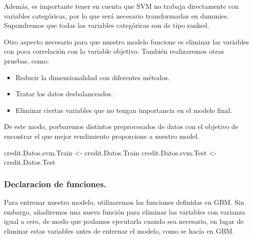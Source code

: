 \documentclass[
]{article}
\newenvironment{Shaded}{\begin{snugshade}}{\end{snugshade}}
\newcommand{\NormalTok}[1]{#1}
\newcommand{\OtherTok}[1]{\textcolor[rgb]{0.56,0.35,0.01}{#1}}
\begin{document}
Además, es importante tener en cuenta que SVM no trabaja directamente
con variables categóricas, por lo que será necesario transformarlas en
dummies. Supondremos que todas las variables categóricas son de tipo
ranked.

Otro aspecto necesario para que nuestro modelo funcione es eliminar las
variables con poca correlación con la variable objetivo. También
realizaremos otras pruebas, como:

\begin{itemize}
\item
  Reducir la dimensionalidad con diferentes métodos.
\item
  Tratar los datos desbalanceados.
\item
  Eliminar ciertas variables que no tengan importancia en el modelo
  final.
\end{itemize}

De este modo, porbaremos distintos preprocesados de datos con el
objetivo de encontrar el que mejor rendimiento proporcione a nuestro
model.

\begin{Shaded}
\begin{Highlighting}[]
\NormalTok{credit.Datos.svm.Train }\OtherTok{\textless{}{-}}\NormalTok{ credit.Datos.Train}
\NormalTok{credit.Datos.svm.Test }\OtherTok{\textless{}{-}}\NormalTok{ credit.Datos.Test}
\end{Highlighting}
\end{Shaded}

\hypertarget{declaracion-de-funciones.}{%
\subsubsection{Declaracion de
funciones.}\label{declaracion-de-funciones.}}

Para entrenar nuestro modelo, utilizaremos las funciones definidas en
GBM. Sin embargo, añadiremos una nueva función para eliminar las
variables con varianza igual a cero, de modo que podamos ejecutarla
cuando sea necesario, en lugar de eliminar estas variables antes de
entrenar el modelo, como se hacía en GBM.
\end{document}
